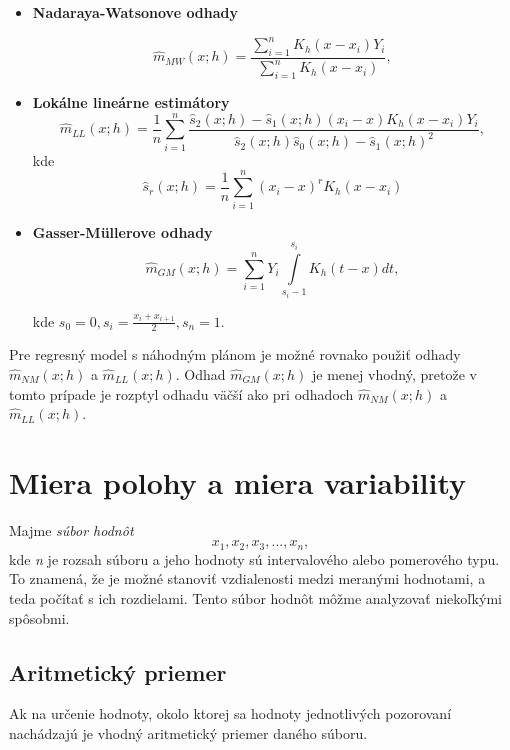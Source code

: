\begin{itemize}
\item  \textbf{Nadaraya-Watsonove odhady}

\begin{equation*}
\hat{m}_{MW}(x;h) = \frac{\sum\limits_{i=1}^{n} K_h(x - x_i)Y_i}{\sum\limits_{i=1}^{n} K_h(x - x_i)},
\end{equation*}

\item
 \textbf{Lokálne lineárne estimátory}
\begin{equation*}
\hat{m}_{LL}(x;h) = \frac{1}{n}\sum\limits_{i=1}^{n}\frac{{\hat{s}_2(x;h) - \hat{s}_1(x;h)(x_i - x)}K_h(x-x_i)Y_i}{\hat{s}_2(x;h)\hat{s}_0(x;h) - \hat{s}_1(x;h)^2},
\end{equation*}
kde 
\begin{equation*}
\hat{s}_r(x;h) = \frac{1}{n}\sum\limits_{i=1}^{n}(x_i - x)^rK_h(x-x_i)
\end{equation*}

\item
\textbf{Gasser-Müllerove odhady}
\begin{equation*}
\hat{m}_{GM}(x;h) = \sum\limits_{i=1}^{n} Y_i \int\limits_{s_i-1}^{s_i}K_h(t-x)dt,
\end{equation*}

kde $s_0 = 0 , s_i = \frac{x_i + x_{i+1}}{2}, s_n = 1$.

\end{itemize}

Pre regresný model s náhodným plánom je možné rovnako použiť odhady $\hat{m}_{NM}(x;h)$ a $\hat{m}_{LL}(x;h)$. Odhad $ \hat{m}_{GM}(x;h)$ je menej vhodný, pretože v tomto prípade je rozptyl odhadu väčší ako pri odhadoch $\hat{m}_{NM}(x;h)$ a $\hat{m}_{LL}(x;h)$.

\section{Miera polohy a miera variability}

Majme \textit{súbor hodnôt}
 \begin{equation}
x_1,x_2,x_3,...,x_n,
\end{equation}  
kde \textit{n} je rozsah súboru a jeho hodnoty sú intervalového alebo pomerového typu. To znamená, že je možné  stanoviť vzdialenosti medzi meranými hodnotami, a teda počítať s ich rozdielami. Tento súbor hodnôt môžme analyzovať niekoľkými spôsobmi.

\subsection{Aritmetický priemer}
Ak na určenie hodnoty, okolo ktorej sa hodnoty jednotlivých pozorovaní nachádzajú je vhodný aritmetický priemer daného súboru. 

